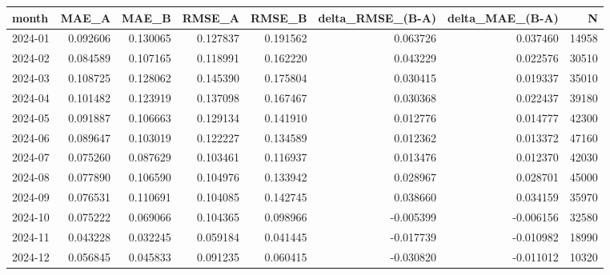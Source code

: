 \begin{tabular}{lrrrrrrr}
\toprule
month & MAE_A & MAE_B & RMSE_A & RMSE_B & delta_RMSE_(B-A) & delta_MAE_(B-A) & N \\
\midrule
2024-01 & 0.092606 & 0.130065 & 0.127837 & 0.191562 & 0.063726 & 0.037460 & 14958 \\
2024-02 & 0.084589 & 0.107165 & 0.118991 & 0.162220 & 0.043229 & 0.022576 & 30510 \\
2024-03 & 0.108725 & 0.128062 & 0.145390 & 0.175804 & 0.030415 & 0.019337 & 35010 \\
2024-04 & 0.101482 & 0.123919 & 0.137098 & 0.167467 & 0.030368 & 0.022437 & 39180 \\
2024-05 & 0.091887 & 0.106663 & 0.129134 & 0.141910 & 0.012776 & 0.014777 & 42300 \\
2024-06 & 0.089647 & 0.103019 & 0.122227 & 0.134589 & 0.012362 & 0.013372 & 47160 \\
2024-07 & 0.075260 & 0.087629 & 0.103461 & 0.116937 & 0.013476 & 0.012370 & 42030 \\
2024-08 & 0.077890 & 0.106590 & 0.104976 & 0.133942 & 0.028967 & 0.028701 & 45000 \\
2024-09 & 0.076531 & 0.110691 & 0.104085 & 0.142745 & 0.038660 & 0.034159 & 35970 \\
2024-10 & 0.075222 & 0.069066 & 0.104365 & 0.098966 & -0.005399 & -0.006156 & 32580 \\
2024-11 & 0.043228 & 0.032245 & 0.059184 & 0.041445 & -0.017739 & -0.010982 & 18990 \\
2024-12 & 0.056845 & 0.045833 & 0.091235 & 0.060415 & -0.030820 & -0.011012 & 10320 \\
\bottomrule
\end{tabular}
